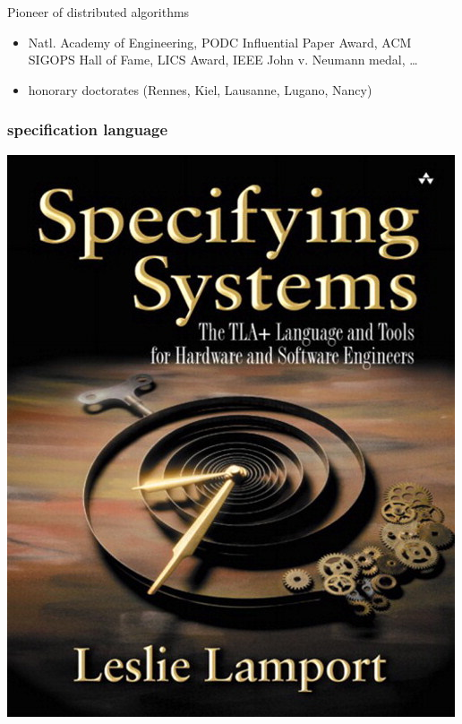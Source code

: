 \documentclass[fleqn]{beamer}
\begin{document}
\begin{frame}
\bigskip

  Pioneer of distributed algorithms

  \begin{small}
  \begin{itemize}
  \item Natl. Academy of Engineering,
    PODC Influential Paper Award, ACM SIGOPS Hall of Fame, LICS Award,
    IEEE John v. Neumann medal, \ldots
  \item honorary doctorates (Rennes, Kiel, Lausanne, Lugano, Nancy)
  \end{itemize}
  \end{small}
\end{frame}

\begin{frame}
  \frametitle{\tlaplus{} specification language}

  \begin{minipage}{0.27\linewidth}
    \includegraphics[width=\linewidth]{figs/tla-book-cover}
  \end{minipage}
  \hfill
  \begin{minipage}{.7\linewidth}
    \raggedright


\end{minipage}
\end{frame}
\end{document}
